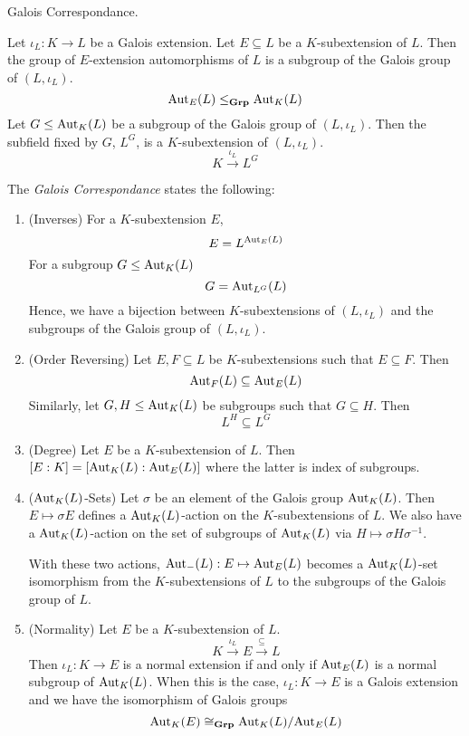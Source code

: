 \documentclass[../book.tex]{subfiles}
\begin{document}
\begin{thm} Galois Correspondance. 
    
    Let $\iota_L : K \to L$ be a Galois extension.
    Let $E \subseteq L$ be a $K$-subextension of $L$. 
    Then the group of $E$-extension automorphisms of $L$ is
    a subgroup of the Galois group of $(L,\iota_L)$. \[
        \text{Aut}_{E}(L) \leq_{\mathbf{Grp}} \text{Aut}_{K}(L)
    \]
    Let $G \leq \text{Aut}_{K}(L)$ be a subgroup of the Galois group of $(L,\iota_L)$. 
    Then the subfield fixed by $G$, $L^G$, is a $K$-subextension of $(L,\iota_L)$.
    \[ K \overset{\iota_L}{\to} L^G \]
    
    The \emph{Galois Correspondance} states the following: 
    \begin{enumerate}
        \item (Inverses)
            For a $K$-subextension $E$, \[
                E = L^{\text{Aut}_{E}(L)}
            \]
            For a subgroup $G \leq \text{Aut}_{K}(L)$ \[
                G = \text{Aut}_{L^G}(L)
            \]
            Hence, we have a bijection between $K$-subextensions of $(L,\iota_L)$
            and the subgroups of the Galois group of $(L,\iota_L)$.
        \item (Order Reversing) 
            Let $E, F \subseteq L$ be $K$-subextensions such that $E \subseteq F$.
            Then \[ \text{Aut}_{F}(L) \subseteq \text{Aut}_{E}(L) \]
            Similarly, 
            let $G, H \leq \text{Aut}_{K}(L)$ be subgroups such that $G \subseteq H$.
            Then \[ L^H \subseteq L^G \]
        \item (Degree) 
            Let $E$ be a $K$-subextension of $L$. 
            Then $[E : K] = [\text{Aut}_{K}(L) : \text{Aut}_{E}(L)]$
            where the latter is index of subgroups. 
        \item ($\text{Aut}_{K}(L)$-Sets)
            Let $\sigma$ be an element of the Galois group $\text{Aut}_{K}(L)$.
            Then $E \mapsto \sigma E$ defines a $\text{Aut}_{K}(L)$-action
            on the $K$-subextensions of $L$. 
            We also have a $\text{Aut}_{K}(L)$-action 
            on the set of subgroups of $\text{Aut}_{K}(L)$ via 
            $H \mapsto \sigma H \sigma^{-1}$.
            
            With these two actions, $\text{Aut}_{-}(L) : E \mapsto \text{Aut}_{E}(L)$
            becomes a $\text{Aut}_{K}(L)$-set isomorphism from the $K$-subextensions of $L$
            to the subgroups of the Galois group of $L$. 
        \item (Normality)
            Let $E$ be a $K$-subextension of $L$. \[
                K \overset{\iota_L}{\to} E \overset{\subseteq}{\to} L
            \]
            Then $\iota_L : K \to E$ is a normal extension if and only if
            $\text{Aut}_{E}(L)$ is a normal subgroup of $\text{Aut}_{K}(L)$. 
            When this is the case, $\iota_L : K \to E$ is a Galois extension
            and we have the isomorphism of Galois groups \[
                \text{Aut}_{K}(E) \cong_{\mathbf{Grp}} \text{Aut}_{K}(L) / \text{Aut}_{E}(L)
            \]
    \end{enumerate}
\end{thm}
\end{document}
